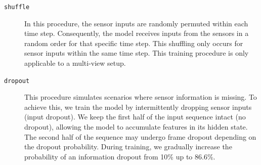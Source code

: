 \begin{description}
    \item[\texttt{shuffle}] In this procedure, the sensor inputs are randomly permuted within each time step. Consequently, the model receives inputs from the sensors in a random order for that specific time step. This shuffling only occurs for sensor inputs within the same time step. This training procedure is only applicable to a multi-view setup.

    \item[\texttt{dropout}] This procedure simulates scenarios where sensor information is missing. To achieve this, we train the model by intermittently dropping sensor inputs (input dropout). We keep the first half of the input sequence intact (no dropout), allowing the model to accumulate features in its hidden state. The second half of the sequence may undergo frame dropout depending on the dropout probability. During training, we gradually increase the probability of an information dropout from 10\% up to 86.6\%.
\end{description}



